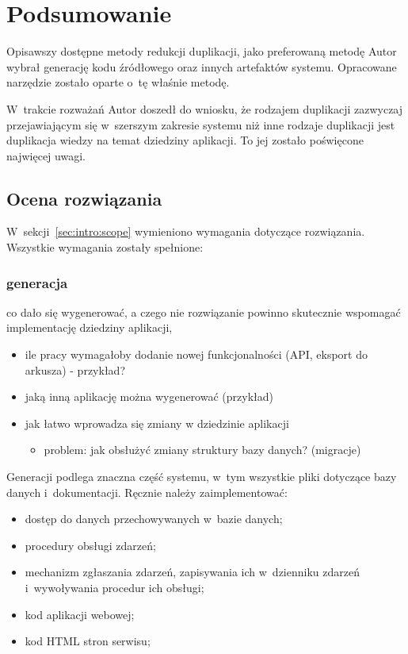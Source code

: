 \chapter{Podsumowanie} \label{chap:outro}

Opisawszy dostępne metody redukcji duplikacji, jako preferowaną metodę Autor wybrał generację kodu źródłowego oraz innych artefaktów systemu.
Opracowane narzędzie zostało oparte o~tę właśnie metodę.

W~trakcie rozważań Autor doszedł do wniosku, że rodzajem duplikacji zazwyczaj przejawiającym się w~szerszym zakresie systemu niż inne rodzaje duplikacji jest duplikacja wiedzy na temat dziedziny aplikacji.
To jej zostało poświęcone najwięcej uwagi.



\section{Ocena rozwiązania}

W~sekcji~\ref{sec:intro:scope} wymieniono wymagania dotyczące rozwiązania.
Wszystkie wymagania zostały spełnione:


\subsection{generacja}

co dało się wygenerować, a czego nie
rozwiązanie powinno skutecznie wspomagać implementację dziedziny aplikacji,

\begin{itemize}
 \item ile pracy wymagałoby dodanie nowej funkcjonalności (API, eksport do arkusza) - przykład?
 \item jaką inną aplikację można wygenerować (przykład)
 \item jak łatwo wprowadza się zmiany w dziedzinie aplikacji
  \begin{itemize}
   \item problem: jak obsłużyć zmiany struktury bazy danych? (migracje)
  \end{itemize}
\end{itemize}

Generacji podlega znaczna część systemu, w~tym wszystkie pliki dotyczące bazy danych i~dokumentacji.
Ręcznie należy zaimplementować:

\begin{itemize}
 \item dostęp do danych przechowywanych w~bazie danych;
 \item procedury obsługi zdarzeń;
 \item mechanizm zgłaszania zdarzeń, zapisywania ich w~dzienniku zdarzeń i~wywoływania procedur ich obsługi;
 \item kod aplikacji webowej;
 \item kod HTML stron serwisu;
\end{itemize}


